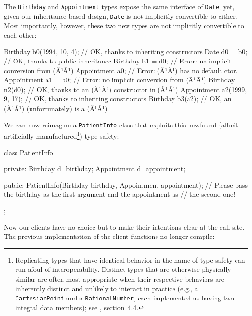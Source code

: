 \noindent The \lstinline!Birthday! and \lstinline!Appointment! types expose the same
interface of \lstinline!Date!, yet, given our inheritance-based design,
\lstinline!Date! is not implicitly convertible to either. Most importantly,
however, these two new types are not implicitly convertible to each
other:

\begin{emcppslisting}[language=C++]
Birthday b0(1994, 10, 4);  // OK, thanks to inheriting constructors
Date d0 = b0;              // OK, thanks to public inheritance
Birthday b1 = d0;          // Error: no implicit conversion from (Ã¹{}Ã¹)
Appointment a0;            // Error: (Ã¹{}Ã¹) has no default ctor.
Appointment a1 = b0;       // Error: no implicit conversion from (Ã¹{}Ã¹)
Birthday n2(d0);           // OK, thanks to an (Ã¹{}Ã¹) constructor in (Ã¹{}Ã¹)
Appointment a2(1999, 9, 17); // OK, thanks to inheriting constructors           
Birthday    b3(a2);          // OK, an (Ã¹{}Ã¹) (unfortunately) is a (Ã¹{}Ã¹)
\end{emcppslisting}
    
\noindent We can now reimagine a \lstinline!PatientInfo! class that exploits this
newfound (albeit artificially manufactured{\cprotect\footnote{Replicating
types that have identical behavior in the name of type safety can run
afoul of interoperability. Distinct types that are otherwise
physically similar are often most appropriate when their respective
behaviors are inherently distinct and unlikely to interact in practice
(e.g., a \mbox{\lstinline!CartesianPoint!} and a \mbox{\lstinline!RationalNumber!},
each implemented as having two integral data members); see
  \cite{lakos2a}, section~4.4.}}) type-safety:

\begin{emcppslisting}[language=C++]
class PatientInfo
{
private:
    Birthday d_birthday;
    Appointment d_appointment;

public:
    PatientInfo(Birthday birthday, Appointment appointment);
        // Please pass the birthday as the first argument and the appointment as
        // the second one! 
};
\end{emcppslisting}
    
\noindent Now our clients have no choice but to make their intentions clear at the
call site. The previous implementation of the client functions no longer compile:

